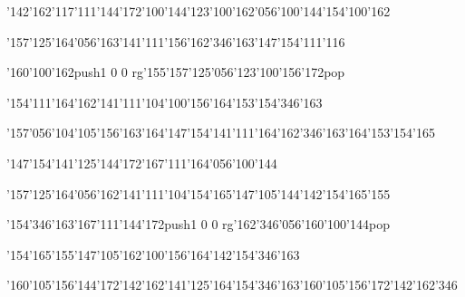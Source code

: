 \null\vfill\ipa\centerline{\enskip\char'142\char'162\char'117\char'111\char'144\char'172\enskip\char'100\char'144\enskip\char'123\char'100\char'162\char'056\char'100\char'144\enskip\enskip\enskip\char'154\char'100\char'162\enskip\enskip\enskip\enskip}\medskip\centerline{\enskip\char'157\char'125\char'164\char'056\char'163\char'141\char'111\char'156\enskip\enskip\enskip\enskip\char'162\char'346\char'163\enskip\enskip\enskip\enskip\enskip\char'147\char'154\char'111\char'116}\medskip\centerline{\enskip\char'160\char'100\char'162\enskip\pdfcolorstack\match push{1 0 0 rg}\char'155\char'157\char'125\char'056\char'123\char'100\char'156\char'172\pdfcolorstack\match pop{}\enskip\enskip\enskip\enskip\enskip\enskip}\medskip\centerline{\enskip\enskip\enskip\enskip\enskip\enskip\enskip\enskip\char'154\char'111\char'164\enskip\char'162\char'141\char'111\char'104\enskip\char'100\char'156\char'164\enskip\char'153\char'154\char'346\char'163}\medskip\centerline{\enskip\char'157\char'056\char'104\char'105\char'156\char'163\char'164\enskip\enskip\enskip\char'147\char'154\char'141\char'111\char'164\enskip\enskip\enskip\enskip\enskip\enskip\char'162\char'346\char'163\char'164\enskip\char'153\char'154\char'165}\medskip\vfill\footline{\hfil\tt\folio\hfil}\eject
\null\vfill\ipa\centerline{\enskip\char'147\char'154\char'141\char'125\char'144\char'172\enskip\enskip\enskip\enskip\char'167\char'111\char'164\char'056\char'100\char'144\enskip\enskip\enskip\enskip\enskip\enskip\enskip\enskip\enskip\enskip}\medskip\centerline{\enskip\char'157\char'125\char'164\char'056\char'162\char'141\char'111\char'104\enskip\char'154\char'165\enskip\char'147\char'105\char'144\enskip\enskip\enskip\enskip\enskip\char'142\char'154\char'165\char'155}\medskip\centerline{\enskip\char'154\char'346\char'163\enskip\enskip\enskip\enskip\char'167\char'111\char'144\char'172\enskip\pdfcolorstack\match push{1 0 0 rg}\char'162\char'346\char'056\char'160\char'100\char'144\pdfcolorstack\match pop{}}\medskip\centerline{\enskip\enskip\enskip\enskip\char'154\char'165\char'155\enskip\char'147\char'105\char'162\enskip\enskip\enskip\enskip\enskip\enskip\char'100\char'156\char'164\enskip\char'142\char'154\char'346\char'163}\medskip\centerline{\enskip\enskip\char'160\char'105\char'156\char'144\char'172\enskip\enskip\enskip\char'142\char'162\char'141\char'125\char'164\enskip\char'154\char'346\char'163\enskip\enskip\enskip\char'160\char'105\char'156\char'172\enskip\char'142\char'162\char'346}\medskip\vfill\footline{\hfil\tt\folio\hfil}\eject
